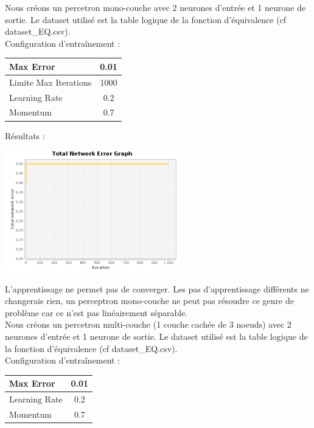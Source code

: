 \documentclass[10pt]{report}
\begin{document}
Nous créons un percetron mono-couche avec 2 neurones d'entrée et 1 neurone de sortie. Le dataset utilisé est la table logique de la fonction d'équivalence (cf dataset\_EQ.csv).\\

Configuration d'entraînement :\\
\begin{tabular}{|l|c|}
	\hline
	Max Error & 0.01 \\
	\hline
	Limite Max Iterations & 1000 \\
	\hline
	Learning Rate & 0.2 \\
	\hline
	Momentum & 0.7 \\
	\hline
\end{tabular}

Résultats :\\
\begin{center}
\includegraphics[height=200px]{img/EQ_EG_1.png}\\
\end{center}

L'apprentissage ne permet pas de converger. Les pas d'apprentissage différents ne changerais rien, un perceptron mono-couche ne peut pas résoudre ce genre de problème car ce n'est pas linéairement séparable.\\

Nous créons un percetron multi-couche (1 couche cachée de 3 noeuds) avec 2 neurones d'entrée et 1 neurone de sortie. Le dataset utilisé est la table logique de la fonction d'équivalence (cf dataset\_EQ.csv).\\

Configuration d'entraînement :\\
\begin{tabular}{|l|c|}
	\hline
	Max Error & 0.01 \\
	\hline
	Learning Rate & 0.2 \\
	\hline
	Momentum & 0.7 \\
	\hline
\end{tabular}
\end{document}
